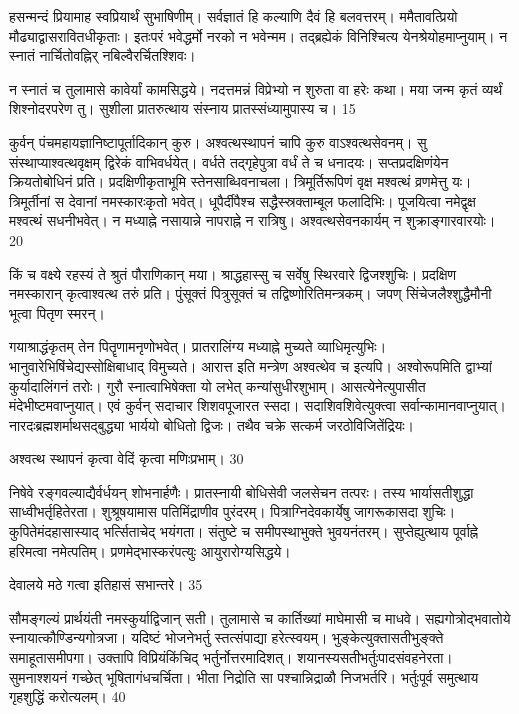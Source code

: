 हसन्मन्दं प्रियामाह स्वप्रियार्थं सुभाषिणीम्।
सर्वज्ञातं हि कल्याणि दैवं हि बलवत्तरम्।
ममैतावत्प्रियो मौढ्याद्वासरावितधीकृताः।
इतःपरं भवेद्धर्मो नरको न भवेन्मम।
तद्ब्रह्येकं विनिश्चित्य येनश्रेयोहमाप्नुयाम्।
न स्नातं नार्चितोवह्निर् नबिल्वैरर्चितश्शिवः।

न स्नातं च तुलामासे कावेर्यां कामसिद्धये।
नदत्तमन्नं विप्रेभ्यो न शुरुता वा हरेः कथा।
मया जन्म कृतं व्यर्थं शिश्नोदरपरेण तु।
सुशीला
प्रातरुत्थाय संस्नाय प्रातस्संध्यामुपास्य च।
15

कुर्वन् पंचमहायज्ञानिष्टापूर्तादिकान् कुरु।
अश्वत्थस्थापनं चापि कुरु वाऽश्वत्थसेवनम्।
सु संस्थाप्याश्वत्थवृक्षम् द्विरेकं वाभिवर्धयेत्।
वर्धते तद्गृहेपुत्रा वर्धं ते च धनादयः।
सप्तप्रदक्षिणंयेन क्रियतोबोधिनं प्रति।
प्रदक्षिणीकृताभूमि स्तेनसाब्धिवनाचला।
त्रिमूर्तिरूपिणं वृक्ष मश्वत्थं व्रणमेत्तु यः।
त्रिमूर्तीनां स देवानां नमस्कारःकृतो भवेत्।
धूपैर्दीपैश्च सद्धैस्स्रक्ताम्बूल फलादिभिः।
पूजयित्वा नमेद्वृक्ष मश्वत्थं सधनीभवेत्।
न मध्याह्ने नसायान्ने नापराह्ने न रात्रिषु।
अश्वत्थसेवनकार्यम् न शुक्राङ्गारवारयोः।
20

किं च वक्ष्ये रहस्यं ते श्रुतं पौराणिकान् मया।
श्राद्धहास्सु च सर्वेषु स्थिरवारे द्विजश्शुचिः।
प्रदक्षिण नमस्कारान् कृत्वाश्वत्थ तरुं प्रति।
पुंसूक्तं पित्रुसूक्तं च तद्विष्णोरितिमन्त्रकम्।
जपण् सिंचेजलैश्शुद्धैमौनी भूत्वा पितृण स्मरन्।

गयाश्राद्धंकृतम् तेन पितॄणामनृणोभवेत्।
प्रातरालिंग्य मध्याह्ने मुच्यते व्याधिमृत्युभिः।
भानुवारेभिषिंचेद्यस्सोक्षिबाधाद् विमुच्यते।
आरात्त इति मन्त्रेण अश्वत्थेव च इत्यपि।
अश्वोरूपमिति द्वाभ्यां कुर्यादालिंगनं तरोः।
गुरौ स्नात्वाभिषेक्ता यो लभेत् कन्यांसुधीरशुभाम्।
आसत्येनेत्युपासीत मंदेभीष्टमवाप्नुयात्।
एवं कुर्वन् सदाचार शिशवपूजारत स्सदा।
सदाशिवशिवेत्युक्त्वा सर्वान्कामानवाप्नुयात्।
नारदःब्रह्मशर्माथसद्बुद्ध्या भार्ययो बोधितो द्विजः।
तथैव चक्रे सत्कर्म जरठोविजितेंद्रियः।

अश्वत्थ स्थापनं कृत्वा वेदिं कृत्वा मणिःप्रभाम्।
30

निषेवे रङ्गवल्याद्यैर्वर्धयन् शोभनार्हणैः।
प्रातस्नायी बोधिसेवी जलसेचन तत्परः।
तस्य भार्यासतीशुद्धा साध्वीभर्तृहितेरता।
शुश्रूषयामास पतिमिंद्राणीव पुरंदरम्।
पित्राग्निदेवकार्येषु जागरूकासदा शुचिः।
कुपितेमंदहासास्याद् भर्त्सिताचेद् भयंगता।
संतुष्टे च समीपस्थाभुक्ते भुवयनंतरम्।
सुप्तेह्युत्थाय पूर्वाह्ने हरिमत्वा नमेत्पतिम्।
प्रणमेद्भास्करंपत्युः आयुरारोग्यसिद्धये।

देवालये मठे गत्वा इतिहासं सभान्तरे।
35

सौमङ्गल्यं प्रार्थयंती नमस्कुर्याद्विजान् सती।
तुलामासे च कार्तिख्यां माघेमासी च माधवे।
सह्यगोत्रोद्भवातोये स्नायात्कौण्डिन्यगोत्रजा।
यदिष्टं भोजनेभर्तु स्तत्संपाद्या हरेत्स्वयम्।
भुङ्केत्युक्तासतीभुङ्क्ते समाहूतासमीपगा।
उक्तापि विप्रियंकिंचिद् भर्तुर्नोत्तरमादिशत्।
शयानस्यसतीभर्तुःपादसंवहनेरता।
सुमनाश्शयनं गच्छेत् भूषितागंधचर्चिता।
भीता निद्रोति सा पश्चान्निद्राळौ निजभर्तरि।
भर्तुःपूर्व समुत्थाय गृहशुद्धिं करोत्यलम्।
40


